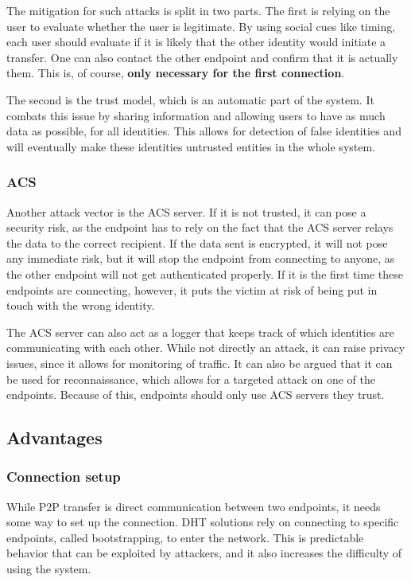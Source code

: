 \documentclass[letterpaper, 10 pt, conference]{ieeeconf}  %
\begin{document}
    The mitigation for such attacks is split in two parts. The first is relying on the user to evaluate whether the user is legitimate. By using social cues like timing, each user should evaluate if it is likely that the other identity would initiate a transfer. One can also contact the other endpoint and confirm that it is actually them. This is, of course, \textbf{only necessary for the first connection}.

    The second is the trust model, which is an automatic part of the system. It combats this issue by sharing information and allowing users to have as much data as possible, for all identities. This allows for detection of false identities and will eventually make these identities untrusted entities in the whole system.
   
    \subsubsection{ACS}
    Another attack vector is the ACS server. If it is not trusted, it can pose a security risk, as the endpoint has to rely on the fact that the ACS server relays the data to the correct recipient. If the data sent is encrypted, it will not pose any immediate risk, but it will stop the endpoint from connecting to anyone, as the other endpoint will not get authenticated properly. If it is the first time these endpoints are connecting, however, it puts the victim at risk of being put in touch with the wrong identity.

    The ACS server can also act as a logger that keeps track of which identities are communicating with each other. While not directly an attack, it can raise privacy issues, since it allows for monitoring of traffic. It can also be argued that it can be used for reconnaissance, which allows for a targeted attack on one of the endpoints. Because of this, endpoints should only use ACS servers they trust.

  \subsection{Advantages}
    \subsubsection{Connection setup}
    While P2P transfer is direct communication between two endpoints, it needs some way to set up the connection. DHT solutions rely on connecting to specific endpoints, called bootstrapping, to enter the network. This is predictable behavior that can be exploited by attackers, and it also increases the difficulty of using the system.
\end{document}
